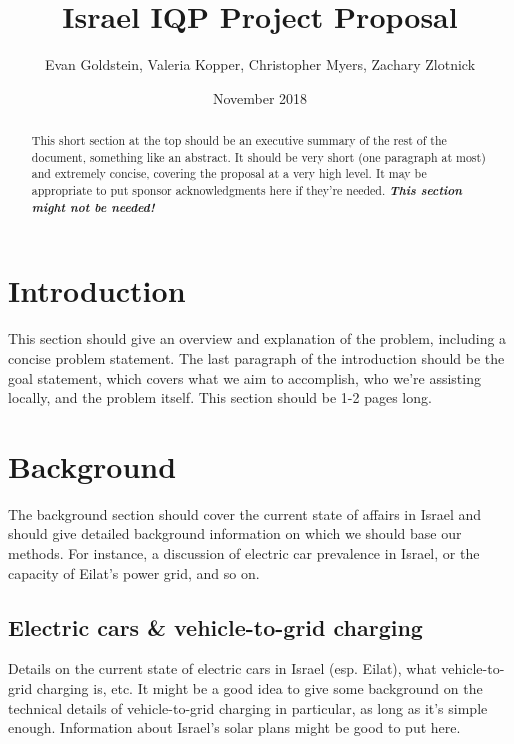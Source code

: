 \documentclass{article}                         %
\title{Israel IQP Project Proposal}
\author{Evan Goldstein, Valeria Kopper, Christopher Myers, Zachary Zlotnick}
\date{November 2018}
\begin{document}
\maketitle

\renewcommand\abstractname{Summary} %
\begin{abstract}
This short section at the top should be an executive summary of the rest of the document, something like an abstract. It should be very short (one paragraph at most) and extremely concise, covering the proposal at a very high level. It may be appropriate to put sponsor acknowledgments here if they're needed. \textbf{\textit{This section might not be needed!}}
\end{abstract}

\tableofcontents
\newpage
{}


\section{Introduction}
This section should give an overview and explanation of the problem, including a concise problem statement. The last paragraph of the introduction should be the goal statement, which covers what we aim to accomplish, who we're assisting locally, and the problem itself. This section should be 1-2 pages long.

\newpage
\section{Background}
The background section should cover the current state of affairs in Israel and should give detailed background information on which we should base our methods. For instance, a discussion of electric car prevalence in Israel, or the capacity of Eilat's power grid, and so on.

\subsection{Electric cars \& vehicle-to-grid charging}
Details on the current state of electric cars in Israel (esp. Eilat), what vehicle-to-grid charging is, etc. It might be a good idea to give some background on the technical details of vehicle-to-grid charging in particular, as long as it's simple enough. Information about Israel's solar plans might be good to put here.
\end{document}
